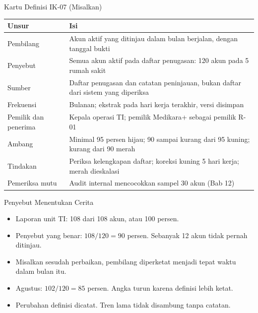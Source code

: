 \documentclass[aspectratio=169, table, 12pt]{beamer}
\begin{document}
\begin{frame}{{\Large Kartu Definisi IK-07 (Misalkan)}}
  \vspace{2pt}
  \scriptsize
  \begin{tabularx}{\textwidth}{|>{\raggedright\arraybackslash}p{}|>{\raggedright\arraybackslash}X|}
    \hline
    \textbf{Unsur} & \textbf{Isi} \\ \hline
    Pembilang & Akun aktif yang ditinjau dalam bulan berjalan, dengan tanggal bukti \\ \hline
    Penyebut & Semua akun aktif pada daftar penugasan: 120 akun pada 5 rumah sakit \\ \hline
    Sumber & Daftar penugasan dan catatan peninjauan, bukan daftar dari sistem yang diperiksa \\
    \hline
    Frekuensi & Bulanan; ekstrak pada hari kerja terakhir, versi disimpan \\ \hline
    Pemilik dan penerima & Kepala operasi TI; pemilik Medikara+ sebagai pemilik R-01 \\ \hline
    Ambang & Minimal 95 persen hijau; 90 sampai kurang dari 95 kuning; kurang dari 90 merah \\
    \hline
    Tindakan & Periksa kelengkapan daftar; koreksi kuning 5 hari kerja; merah dieskalasi \\ \hline
    Pemeriksa mutu & Audit internal mencocokkan sampel 30 akun (Bab 12) \\ \hline
  \end{tabularx}
\end{frame}

\begin{frame}{{\Large Penyebut Menentukan Cerita}}
  \vspace{6pt}
  \small
  \begin{itemize}
    \item Laporan unit TI: 108 dari 108 akun, atau 100 persen.
    \item Penyebut yang benar: $108 / 120 = 90$ persen. Sebanyak 12 akun tidak pernah ditinjau.
    \item Misalkan sesudah perbaikan, pembilang diperketat menjadi tepat waktu dalam bulan itu.
    \item Agustus: $102 / 120 = 85$ persen. Angka turun karena definisi lebih ketat.
    \item Perubahan definisi dicatat. Tren lama tidak disambung tanpa catatan.
  \end{itemize}
\end{frame}
\end{document}
